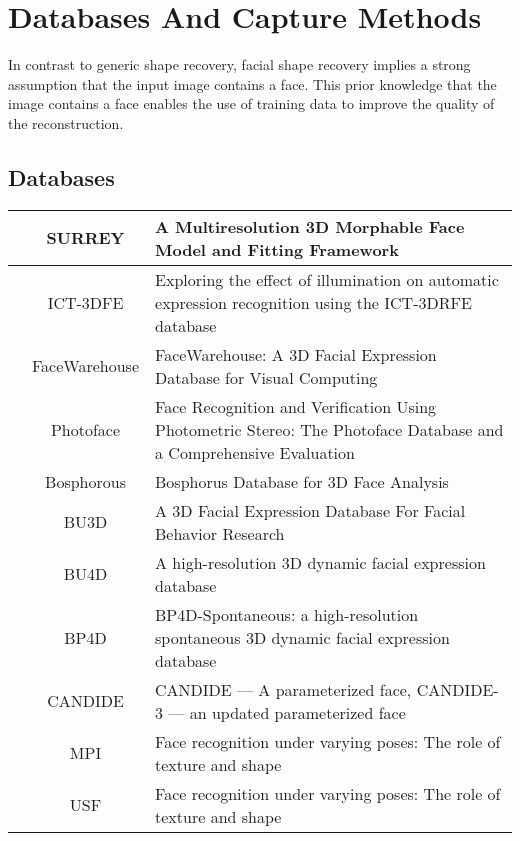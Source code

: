 \section{Databases And Capture Methods}\label{ch:bg_db_capture}
In contrast to generic shape recovery, facial shape recovery implies a strong
assumption that the input image contains a face. This prior knowledge that the
image contains a face enables the use of training data to improve the
quality of the reconstruction.
\subsection{Databases}
\begin{center}
	\begin{tabular}{c c p{}}
		\toprule\cite{Huber:F5Dca9zy} & SURREY & A Multiresolution 3D Morphable Face Model and Fitting Framework \\
		\midrule\cite{stratou2012exploring} & ICT-3DFE & Exploring the effect of illumination on automatic expression recognition using the ICT-3DRFE database \\
		\midrule\cite{Cao:2014gy} & FaceWarehouse & FaceWarehouse: A 3D Facial Expression Database for Visual Computing \\
		\midrule\cite{RefWorks:293} & Photoface & Face Recognition and Verification Using Photometric Stereo: The Photoface Database and a Comprehensive Evaluation \\
		\midrule\cite{Savran:2008gg} & Bosphorous & Bosphorus Database for 3D Face Analysis \\ 
		\midrule\cite{Yin:2006cc} & BU3D & A 3D Facial Expression Database For Facial Behavior Research \\
		\midrule\cite{yin2008high} & BU4D & A high-resolution 3D dynamic facial expression database \\
		\midrule\cite{Zhang:2014id} & BP4D & BP4D-Spontaneous: a high-resolution spontaneous 3D dynamic facial expression database \\
		\midrule\cite{Rydfalk:1987tg,Ahlberg:1998uk} & CANDIDE & CANDIDE --- A parameterized face, CANDIDE-3 --- an updated parameterized face \\
		\midrule\cite{Troje:1996ep} & MPI & Face recognition under varying poses: The role of texture and shape \\
		\midrule\cite{RefWorks:96} & USF & Face recognition under varying poses: The role of texture and shape \\
		\bottomrule
	\end{tabular}
\end{center}
